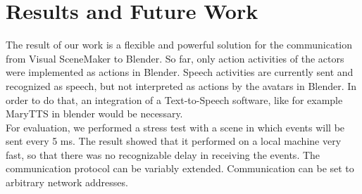 \documentclass[
10pt, %
a4paper, %
oneside,
headinclude,footinclude, %
BCOR5mm, %
]{scrartcl}
\begin{document}

\section{Results and Future Work}
The result of our work is a flexible and powerful solution for the communication from Visual SceneMaker to Blender. So far, only action activities of the actors were implemented as actions in Blender. Speech activities are currently sent and recognized as speech, but not interpreted as actions by the avatars in Blender. In order to do that, an integration of a Text-to-Speech software, like for example MaryTTS in blender would be necessary. \\
For evaluation, we performed a stress test with a scene in which events will be sent every 5 ms. The result showed that it performed on a local machine very fast, so that there was no recognizable delay in receiving the events. The communication protocol can be variably extended. Communication can be set to arbitrary network addresses.
\end{document}
